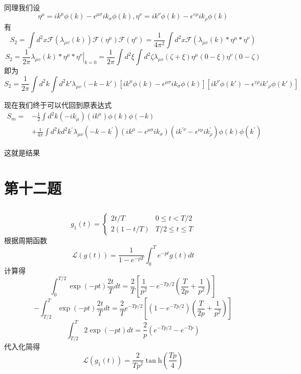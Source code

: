 \documentclass[a4paper]{ctexart}
\begin{document}
同理我们设
$$
    \eta ^{\mu}=ik^{\mu}\phi \left( k \right) -\epsilon ^{\mu \sigma}ik_{\sigma}\phi \left( k \right) ,\eta ^{\nu}=ik^{\nu}\phi \left( k \right) -\epsilon ^{v\rho}ik_{\rho}\phi \left( k \right)
$$
有
$$
    S_2=\int{d}^2x\mathcal{F}\left( \lambda _{\mu v}\left( k \right) \right) \mathcal{F}\left( \eta ^{\mu} \right) \mathcal{F}\left( \eta ^{\nu} \right) =\frac{1}{4\pi ^2}\int{d}^2x\mathcal{F}\left( \lambda _{\mu v}\left( k \right) *\eta ^{\mu}*\eta ^{\nu} \right)
$$
$$
    S_2=\frac{1}{2\pi}\left. \lambda _{\mu v}\left( k \right) *\eta ^{\mu}*\eta ^{\nu} \right|_{k=0}=\frac{1}{2\pi}\int{d}^2\xi \int{d}^2\zeta \lambda _{\mu v}\left( \zeta +\xi \right) \eta ^{\mu}\left( 0-\xi \right) \eta ^{\nu}\left( 0-\zeta \right)
$$
即为
$$
    S_2=\frac{1}{2\pi}\int{d}^2k\int{d}^2k'\lambda _{\mu v}\left( -k-k' \right) \left[ ik^{\mu}\phi \left( k \right) -\epsilon ^{\mu \sigma}ik_{\sigma}\phi \left( k \right) \right] \left[ ik^{\nu}\phi \left( k' \right) -\epsilon ^{v\rho}i{k'}_{\rho}\phi \left( k' \right) \right]
$$

现在我们终于可以代回到原表达式
$$
    \begin{aligned}
        S_{m}
        = & -\frac{1}{2} \int d^{2} k\left(-i k_{\mu}\right)\left(i k^{\mu}\right) \phi(k) \phi(-k)                                                                                                                                                                      \\
          & +\frac{1}{4 \pi} \int d^{2} k d^{2} k^{\prime} \lambda_{\mu \nu}\left(-k-k^{\prime}\right)\left(i k^{\mu}-\epsilon^{\mu \sigma} i k_{\sigma}\right)\left(i k^{\prime \nu}-\epsilon^{\nu \rho} i k_{\rho}^{\prime}\right) \phi(k) \phi\left(k^{\prime}\right)
    \end{aligned}
$$

这就是结果

\section{第十二题}
\subsection{}
$$
    g_1(t)=\left\{\begin{array}{cc}
        2 t / T    & 0 \leq t<T / 2      \\
        2(1-t / T) & T / 2 \leq t \leq T
    \end{array}\right.
$$
根据周期函数
$$
    \mathcal{L}\left( g\left( t \right) \right) =
    \frac{1}{1-e^{-p T}} \int_{0}^{T} e^{-p t} g(t) d t
$$
计算得
$$
    \int_0^{T/2}{\exp \left( -pt \right) \frac{2t}{T}dt=\frac{2}{T}}\left[ \frac{1}{p^2}-e^{-Tp/2}\left( \frac{T}{2p}+\frac{1}{p^2} \right) \right]
$$
$$
    -\int_{T/2}^T{\exp \left( -pt \right) \frac{2t}{T}dt=\frac{2}{T}}e^{-Tp/2}\left[ \left( 1-e^{-Tp/2} \right) \left( \frac{T}{2p}+\frac{1}{p^2} \right) \right]
$$
$$
    \int_{T/2}^T{2\exp \left( -pt \right) dt=\frac{2}{p}}\left( e^{-Tp/2}-e^{-Tp} \right)
$$
代入化简得
$$
    \mathcal{L}\left( g_1\left( t \right) \right) =\frac{2}{Tp^2}\tan\text{h}\left( \frac{Tp}{4} \right)
$$
\end{document}
